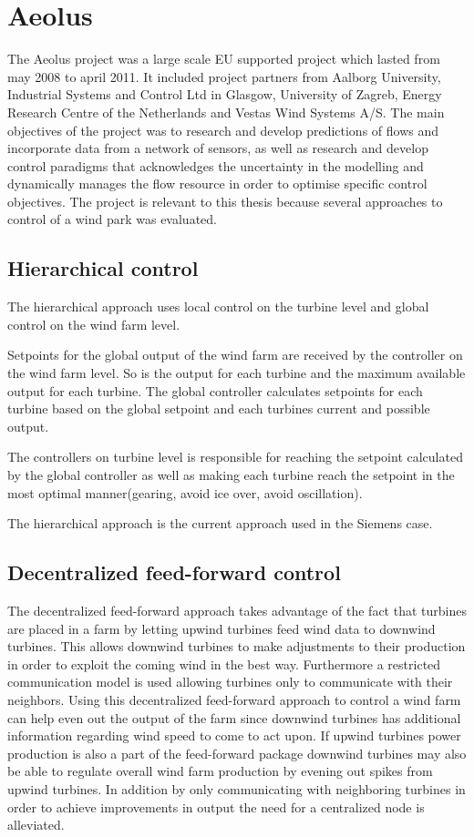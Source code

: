 \section{Aeolus}
The Aeolus project was a large scale EU supported project which lasted from may 2008 to april 2011. It included project partners from 
Aalborg University, Industrial Systems and Control Ltd in Glasgow, University of Zagreb, Energy Research Centre of the Netherlands and Vestas Wind Systems A/S.
The main objectives of the project was to research and develop predictions of flows and incorporate data from a network of sensors, as well as research and develop control paradigms that acknowledges the uncertainty in the modelling and dynamically manages the flow resource in order to optimise specific control objectives.
The project is relevant to this thesis because several approaches to control of a wind park was evaluated.

\subsection{Hierarchical control}
The hierarchical approach uses local control on the turbine level and global control on the wind farm level\cite{HeirarchicalWindFarmControl}.

Setpoints for the global output of the wind farm are received by the controller on the wind farm level.
So is the output for each turbine and the maximum available output for each turbine.
The global controller calculates setpoints for each turbine based on the global setpoint and each turbines current and possible output.

The controllers on turbine level is responsible for reaching the setpoint calculated by the global controller as well as making each turbine reach the setpoint in the most optimal manner(gearing, avoid ice over, avoid oscillation).

The hierarchical approach is the current approach used in the Siemens case.

\subsection{Decentralized feed-forward control}
The decentralized feed-forward approach\cite{DecentralisedFeedforwardControlOfWindFarms} takes advantage of the fact that turbines are placed in a farm by letting upwind turbines feed wind data to downwind turbines. 
This allows downwind turbines to make adjustments to their production in order to exploit the coming wind in the best way.
Furthermore a restricted communication model is used allowing turbines only to communicate with their neighbors.
Using this decentralized feed-forward approach to control a wind farm can help even out the output of the farm since downwind turbines has additional information regarding wind speed to come to act upon. If upwind turbines power production is also a part of the feed-forward package downwind turbines may also be able to regulate overall wind farm production by evening out spikes from upwind turbines.
In addition by only communicating with neighboring turbines in order to achieve improvements in output the need for a centralized node is alleviated.

